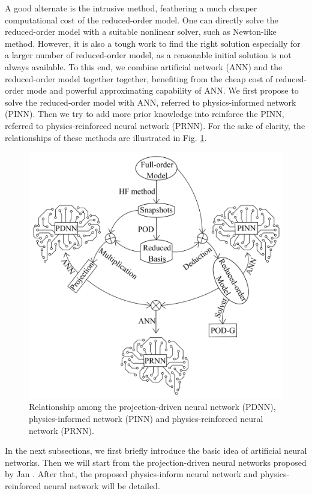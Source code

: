 \documentclass[preprint, 10pt]{elsarticle}
\begin{document}
A good alternate is the intrusive method, feathering a much cheaper computational cost of the reduced-order model. One can directly solve the reduced-order model with a suitable nonlinear solver, such as Newton-like method. 
However, it is also a tough work to find the right solution especially for a larger number of reduced-order model, as a reasonable initial solution is not always available. To this end, we combine artificial network (ANN) and the reduced-order model together together, benefiting from the cheap cost of reduced-order mode and powerful approximating capability of ANN. We first propose to solve the reduced-order model with ANN, referred to physics-informed network (PINN). Then we try to add more prior knowledge into reinforce the PINN, referred to physics-reinforced neural network (PRNN). For the sake of clarity, the relationships of these methods are illustrated in Fig. \ref{fig_relationship}.
\begin{figure}[!ht]
  \centering
  \includegraphics[width=12cm]{../fig/RelationshipChart.pdf}
\caption{Relationship among the projection-driven neural network (PDNN), physics-informed network (PINN) and physics-reinforced neural network (PRNN).}
\label{fig_relationship}
\end{figure}

In the next subsections, we first briefly introduce the basic idea of artificial neural networks. Then we will start from the projection-driven neural networks proposed by Jan \cite{hesthaven2018non}. After that, the proposed physics-inform neural network and physics-reinforced neural network will be detailed.
\end{document}
